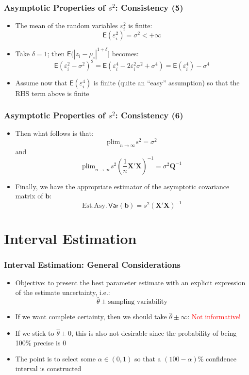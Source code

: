 \documentclass[10pt]{beamer}
\newcommand{\var}{\mathsf{Var}}
\newcommand{\plim}{\mathrm{plim}}
\theoremstyle{definition}
\begin{document}
\begin{frame}[fragile]
\frametitle{Asymptotic Properties of $s^{2}$: Consistency (5)}
\begin{itemize}
	\item The mean of the random variables $\varepsilon_{i}^{2}$ is finite:
	\[
		\mathsf{E}(\varepsilon_{i}^{2}) = \sigma^{2} < +\infty
	\]
	\item Take $\delta = 1$; then $\mathsf{E}(|z_{i} - \mu_i|^{1+\delta}]$ becomes:
	\[
		\mathsf{E}(\varepsilon_{i}^{2} - \sigma^{2})^{2} = \mathsf{E}(\varepsilon_{i}^{4} - 2\varepsilon_{i}^{2}\sigma^{2} + \sigma^{4}) = \mathsf{E}(\varepsilon_{i}^{4}) - \sigma^{4}
	\]
	\item Assume now that $\mathsf{E}(\varepsilon_{i}^{4})$ is finite (quite an ``easy'' assumption) so that the RHS term above is finite
\end{itemize}
\end{frame}

\begin{frame}[fragile]
\frametitle{Asymptotic Properties of $s^{2}$: Consistency (6)}
\begin{itemize}
	\item Then what follows is that:
	\[
		\plim_{n\to\infty} s^{2} = \sigma^{2}
	\]
	and
	\[
		\plim_{n\to\infty} s^{2}\left(\frac{1}{n}\mathbf{X'X}\right)^{-1} = \sigma^{2}\mathbf{Q}^{-1}
	\]
	\item Finally, we have the appropriate estimator of the asymptotic covariance matrix of $\mathbf{b}$:
	\[
		\mathrm{Est.Asy.}\,\var(\mathbf{b}) = s^{2}\left(\mathbf{X'X}\right)^{-1}
	\]
\end{itemize}
\end{frame}

\section{Interval Estimation}
\begin{frame}
	\frametitle{Interval Estimation: General Considerations}
	\begin{itemize}
		\item Objective: to present the best parameter estimate with an explicit expression of the estimate uncertainty, i.e.:
		\[
		\widehat{\theta} \pm \textrm{sampling variability}
		\]
		
		\item If we want complete certainty, then we should take $ \widehat{\theta} \pm \infty $: \textcolor{red}{Not informative!}
		\item  If we stick to $ \widehat{\theta} \pm 0 $, this is also not desirable since the probability of being 100\% precise is 0
		\item The point is to select some $ \alpha \in (0, 1) $ so that a $ (100 - \alpha) $\% confidence interval is constructed
	\end{itemize}
\end{frame}
\end{document}
